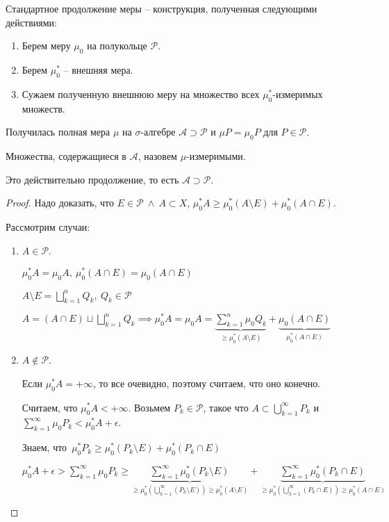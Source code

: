 \begin{definition}
    Стандартное продолжение меры -- конструкция, полученная следующими действиями:
    \begin{enumerate}
        \item {
            Берем меру $\mu_0$ на полукольце $\mathcal{P}$.
        }
        \item {
            Берем $\mu^*_0$ -- внешняя мера.
        }
        \item {
            Сужаем полученную внешнюю меру на множество всех $\mu^*_0$-измеримых множеств.
        }
    \end{enumerate}

    Получилась полная мера $\mu$ на $\sigma$-алгебре $\mathcal{A} \supset \mathcal{P}$ и $\mu P = \mu_0 P$ для $P \in \mathcal{P}$.

    Множества, содержащиеся в $\mathcal{A}$, назовем $\mu$-измеримыми.
\end{definition}

\begin{theorem}
    Это действительно продолжение, то есть $\mathcal{A} \supset \mathcal{P}$.
\end{theorem}
\begin{proof}
    Надо доказать, что $E \in \mathcal{P} \ \land \ A \subset X$, $\mu^*_0 A \geq \mu^*_0 (A \setminus E) + \mu^*_0 (A \cap E)$.

    Рассмотрим случаи:
    \begin{enumerate}
        \item {
            $A \in \mathcal{P}$.

            $\mu^*_0 A = \mu_0 A, \ \mu^*_0 (A \cap E) = \mu_0 (A \cap E)$

            $A \setminus E = \bigsqcup_{k=1}^{n} Q_k, \ Q_k \in \mathcal{P}$

            $A = (A \cap E) \sqcup \bigsqcup_{k=1}^{n} Q_k \implies \mu^*_0 A = \mu_0 A = \underbrace{\sum_{k=1}^{n} \mu_0 Q_k}_{\geq \mu^*_0 (A \setminus E)} + \underbrace{\mu_0 (A \cap E)}_{\mu^*_0 (A \cap E)}$
        }
        \item {
            $A \notin \mathcal{P}$.

            Если $\mu^*_0A = +\infty$, то все очевидно, поэтому считаем, что оно конечно.

            Считаем, что $\mu^*_0 A < +\infty$. Возьмем $P_k \in \mathcal{P}$, такое что $A \subset \bigcup_{k=1}^{\infty} P_k$ и $\sum_{k=1}^{\infty} \mu_0 P_k < \mu^*_0 A + \epsilon$.

            Знаем, что $\mu^*_0 P_k \geq \mu^*_0 (P_k \setminus E) + \mu^*_0 (P_k \cap E)$

            $\mu^*_0 A + \epsilon > \sum_{k=1}^{\infty} \mu_0 P_k \geq \underbrace{\sum_{k=1}^{\infty} \mu^*_0 (P_k \setminus E)}_{\geq \mu^*_0 (\bigcup_{k=1}^{\infty} (P_k \setminus E)) \geq \mu^*_0 (A \setminus E)} + \underbrace{\sum_{k=1}^{\infty} \mu^*_0 (P_k \cap E)}_{\geq \mu^*_0 (\bigcup_{k=1}^{\infty} (P_k \cap E)) \geq \mu^*_0 (A \cap E)}$
        }
    \end{enumerate}
\end{proof}

